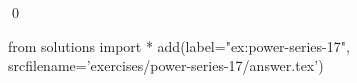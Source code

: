 
    \begin{ex}
  \label{ex:power-series-17}
  
  \qed
\end{ex}
\begin{python0}
from solutions import *
add(label="ex:power-series-17",
    srcfilename='exercises/power-series-17/answer.tex') 
\end{python0}                              
